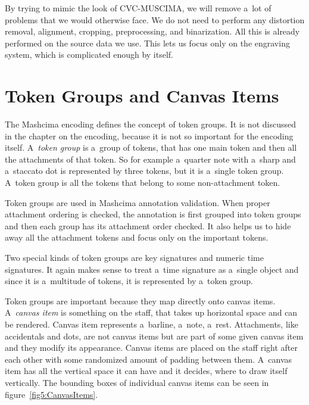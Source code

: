 By trying to mimic the look of CVC-MUSCIMA, we will remove a~lot of problems that we would otherwise face. We do not need to perform any distortion removal, alignment, cropping, preprocessing, and binarization. All this is already performed on the source data we use. This lets us focus only on the engraving system, which is complicated enough by itself.


\section{Token Groups and Canvas Items}

The Mashcima encoding defines the concept of token groups. It is not discussed in the chapter on the encoding, because it is not so important for the encoding itself. A~\emph{token group} is a~group of tokens, that has one main token and then all the attachments of that token. So for example a~quarter note with a~sharp and a~staccato dot is represented by three tokens, but it is a~single token group. A~token group is all the tokens that belong to some non-attachment token.

Token groups are used in Mashcima annotation validation. When proper attachment ordering is checked, the annotation is first grouped into token groups and then each group has its attachment order checked. It also helps us to hide away all the attachment tokens and focus only on the important tokens.

Two special kinds of token groups are key signatures and numeric time signatures. It again makes sense to treat a~time signature as a~single object and since it is a~multitude of tokens, it is represented by a~token group.

Token groups are important because they map directly onto canvas items. A~\emph{canvas item} is something on the staff, that takes up horizontal space and can be rendered. Canvas item represents a~barline, a~note, a~rest. Attachments, like accidentals and dots, are not canvas items but are part of some given canvas item and they modify its appearance. Canvas items are placed on the staff right after each other with some randomized amount of padding between them. A~canvas item has all the vertical space it can have and it decides, where to draw itself vertically. The bounding boxes of individual canvas items can be seen in figure~\ref{fig5:CanvasItems}.

